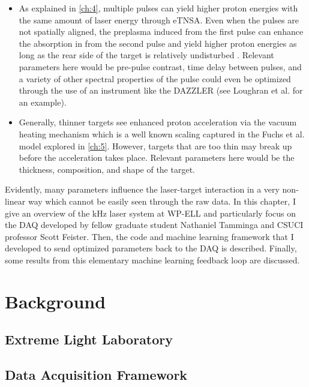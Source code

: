 \begin{itemize}
\item As explained in \autoref{ch:4}, multiple pulses can yield higher proton energies with the same amount of laser energy through \gls{eTNSA}. Even when the pulses are not spatially aligned, the preplasma induced from the first pulse can enhance the absorption in from the second pulse and yield higher proton energies as long as the rear side of the target is relatively undisturbed \cite{Macchi_2013_RevModPhys}. Relevant parameters here would be pre-pulse contrast, time delay between pulses, and a variety of other spectral properties of the pulse could even be optimized through the use of an instrument like the DAZZLER (see Loughran et al. \cite{Loughran_2023_HPLSE} for an example). 

\item Generally, thinner targets see enhanced proton acceleration via the vacuum heating mechanism which is a well known scaling captured in the Fuchs et al. \cite{Fuchs_2005_Nat} model explored in \autoref{ch:5}. However, targets that are too thin may break up before the acceleration takes place. Relevant parameters here would be the thickness, composition, and shape of the target. 
\end{itemize}

Evidently, many parameters influence the laser-target interaction in a very non-linear way which cannot be easily seen through the raw data. In this chapter, I give an overview of the kHz laser system at \gls{WP-ELL} and particularly focus on the \gls{DAQ} developed by fellow graduate student Nathaniel Tamminga and \gls{CSUCI} professor Scott Feister. Then, the code and machine learning framework that I developed to send optimized parameters back to the \gls{DAQ} is described. Finally, some results from this elementary machine learning feedback loop are discussed. 

\section{Background}

\subsection{Extreme Light Laboratory}

\subsection{Data Acquisition Framework}

